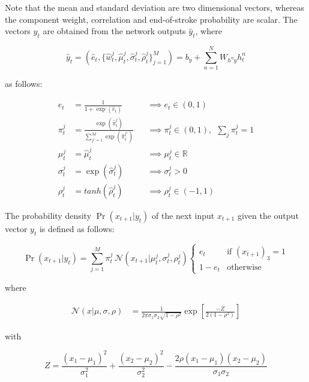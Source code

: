  
Note that the mean and standard deviation are two dimensional vectors, whereas the component weight, correlation and end-of-stroke probability are scalar. The vectors $y_t$ are obtained from the network outputs $\hat{y}_t$, where

\begin{equation}
\label{eq:handwriting_out}
\hat{y}_t = \left(\hat{e}_t,\{\hat{w}_t^j,\hat{\mu}_t^j,\hat{\sigma}_t^j,\hat{\rho}_t^j\}_{j=1}^M\right) = b_y + \sum_{n=1}^N W_{h^n y}h^n_t
\end{equation}

as follows:

\begin{align}
\label{eq:eos}
e_t &= \frac{1}{1+\exp\left(\hat{e}_t\right)} &&\implies e_t \in (0,1)\\
\label{eq:mix_wt}
\pi_t^j &= \frac{\exp\left(\hat{\pi}_t^j\right)}{\sum_{{j'}=1}^M{\exp\left(\hat{\pi}_t^{j'}\right)}} &&\implies \pi_t^j \in (0,1),\ \ \sum_j{\pi_t^j} = 1\\
\label{eq:mean}
\mu_t^j &= \hat{\mu}_t^j &&\implies \mu_t^j \in \mathbb{R}\\
\label{eq:dev}
\sigma_t^j &= \exp\left(\hat{\sigma}_t^j\right) &&\implies \sigma_t^j > 0\\
\label{eq:corr}
\rho_t^j &= tanh(\hat{\rho}_t^j) &&\implies \rho_t^j \in (-1,1)
\end{align}

The probability density $\Pr(x_{t+1}|y_t)$ of the next input $x_{t+1}$ given the output vector $y_t$ is defined as follows:

\begin{equation}
\Pr(x_{t+1}|y_t) = \sum_{j=1}^M{\pi_t^j\ \mathcal{N}(x_{t+1}|\mu_t^j, \sigma_t^j, \rho_t^j )}\begin{cases}e_t  &\text{if } (x_{t+1})_3 = 1\\1-e_t &\text{otherwise}\end{cases}
\end{equation}

where

\begin{align}
\mathcal{N}(x|\mu, \sigma, \rho) &= \frac{1}{2\pi\sigma_1\sigma_2\sqrt{1-\rho^2}} \exp \left[\frac{-Z}{2(1-\rho^2)}\right]
\end{align}

with

\begin{equation} \label{eq:z}
Z = \frac{(x_1-\mu_1)^2}{\sigma_1^2} + \frac{(x_2-\mu_2)^2}{\sigma_2^2} - \frac{2 \rho (x_1-\mu_1)(x_2-\mu_2)}{\sigma_1 \sigma_2} 
\end{equation}

